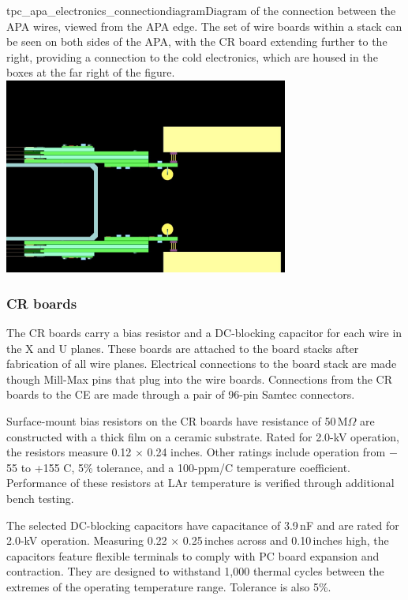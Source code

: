 \begin{cdrfigure}{tpc_apa_electronics_connectiondiagram}{Diagram of the connection between the APA wires, viewed from the APA edge. The set of wire boards within a stack can be seen on both sides of the APA, with the CR board extending further to the right, providing a connection to the cold electronics, which are housed in the boxes at the far right of the figure}.
\includegraphics[width=0.7\textwidth]{figures/tpc_apa_electronics_connectiondiagram.png}
\end{cdrfigure}

\subsubsection{CR boards}
\label{sec:crboards}

The CR boards carry a bias resistor and a DC-blocking capacitor for each wire in the X and U planes. These boards are attached to the board stacks after fabrication of all wire planes.  Electrical connections to the board stack are made though Mill-Max pins that plug into the wire boards. Connections from the CR boards to the CE are made through a pair of 96-pin Samtec connectors.

Surface-mount bias resistors on the CR boards have resistance of 50\,M$\Omega$ are constructed with a thick film on a ceramic substrate. Rated for 2.0-kV operation, the resistors measure 0.12 $\times$ 0.24 inches. Other ratings include operation from $-$55 to +155 C, 5\% tolerance, and a 100-ppm/C temperature coefficient.
Performance of these resistors at LAr temperature is verified through additional bench testing.

The selected DC-blocking capacitors have capacitance of 3.9\,nF and are rated for 2.0-kV operation. Measuring 0.22 $\times$ 0.25\,inches across and 0.10\,inches high, the capacitors feature flexible terminals to comply with PC board expansion and contraction. They are designed to withstand 1,000 thermal cycles  
between the extremes of the operating temperature range. Tolerance is also 5\%.

